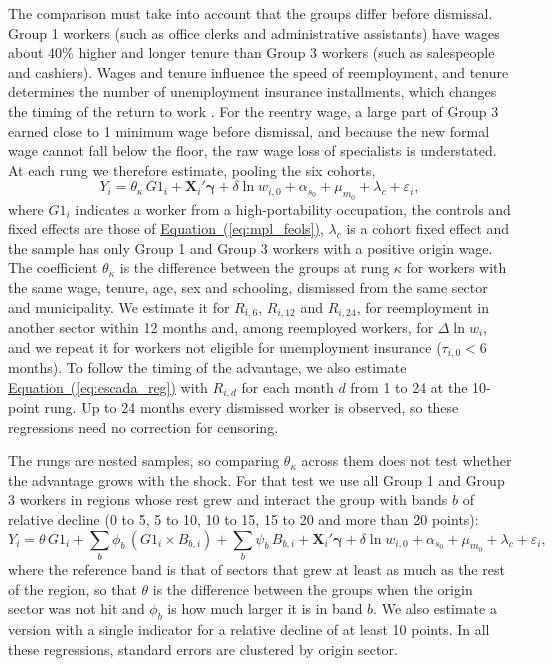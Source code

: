 \documentclass[11pt,a4paper]{article}
\let\citeporig\citep
\renewcommand{\citep}[1]{{\color{citeblue}\citeporig{#1}}}
\begin{document}
The comparison must take into account that the groups differ before dismissal. Group 1 workers (such as office clerks and administrative assistants) have wages about 40\% higher and longer tenure than Group 3 workers (such as salespeople and cashiers). Wages and tenure influence the speed of reemployment, and tenure determines the number of unemployment insurance installments, which changes the timing of the return to work \citep{gerard2021}. For the reentry wage, a large part of Group 3 earned close to 1 minimum wage before dismissal, and because the new formal wage cannot fall below the floor, the raw wage loss of specialists is understated. At each rung we therefore estimate, pooling the six cohorts,
\begin{equation}
Y_i = \theta_\kappa\, G1_i + \mathbf{X}_i'\boldsymbol{\gamma} + \delta \ln w_{i,0} + \alpha_{s_0} + \mu_{m_0} + \lambda_{c} + \varepsilon_i,
\label{eq:escada_reg}
\end{equation}
where $G1_i$ indicates a worker from a high-portability occupation, the controls and fixed effects are those of \hyperref[eq:mpl_feols]{Equation~(\ref*{eq:mpl_feols})}, $\lambda_c$ is a cohort fixed effect and the sample has only Group 1 and Group 3 workers with a positive origin wage. The coefficient $\theta_\kappa$ is the difference between the groups at rung $\kappa$ for workers with the same wage, tenure, age, sex and schooling, dismissed from the same sector and municipality. We estimate it for $R_{i,6}$, $R_{i,12}$ and $R_{i,24}$, for reemployment in another sector within 12 months and, among reemployed workers, for $\Delta \ln w_i$, and we repeat it for workers not eligible for unemployment insurance ($\tau_{i,0} < 6$ months). To follow the timing of the advantage, we also estimate \hyperref[eq:escada_reg]{Equation~(\ref*{eq:escada_reg})} with $R_{i,d}$ for each month $d$ from 1 to 24 at the 10-point rung. Up to 24 months every dismissed worker is observed, so these regressions need no correction for censoring.

The rungs are nested samples, so comparing $\theta_\kappa$ across them does not test whether the advantage grows with the shock. For that test we use all Group 1 and Group 3 workers in regions whose rest grew and interact the group with bands $b$ of relative decline (0 to 5, 5 to 10, 10 to 15, 15 to 20 and more than 20 points):
\begin{equation}
Y_i = \theta\, G1_i + \sum_{b} \phi_b\, (G1_i \times B_{b,i}) + \sum_{b} \psi_b\, B_{b,i} + \mathbf{X}_i'\boldsymbol{\gamma} + \delta \ln w_{i,0} + \alpha_{s_0} + \mu_{m_0} + \lambda_{c} + \varepsilon_i,
\label{eq:escada_int}
\end{equation}
where the reference band is that of sectors that grew at least as much as the rest of the region, so that $\theta$ is the difference between the groups when the origin sector was not hit and $\phi_b$ is how much larger it is in band $b$. We also estimate a version with a single indicator for a relative decline of at least 10 points. In all these regressions, standard errors are clustered by origin sector.
\end{document}
